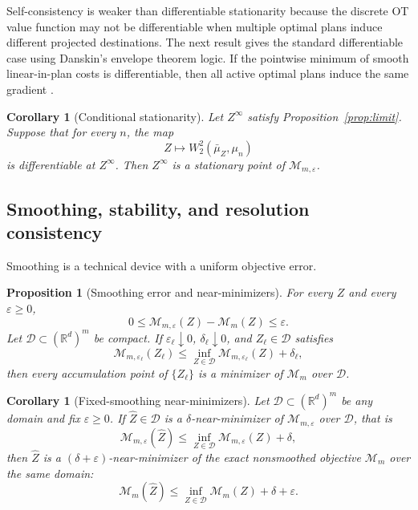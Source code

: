\documentclass[pdflatex,sn-mathphys-ay]{sn-jnl}%
\theoremstyle{thmstyleone}%
\newtheorem{proposition}[theorem]{Proposition}%
\newtheorem{corollary}[theorem]{Corollary}
\theoremstyle{thmstyletwo}%
\theoremstyle{thmstylethree}%
\newcommand{\R}{\mathbb R}
\newcommand{\calM}{\mathcal M}
\newcommand{\eps}{\varepsilon}
\newcommand{\barmu}{\bar\mu}
\begin{document}
Self-consistency is weaker than differentiable stationarity because the discrete OT value function may not be differentiable when multiple optimal plans induce different projected destinations. The next result gives the standard differentiable case using Danskin's envelope theorem logic. If the pointwise minimum of smooth linear-in-plan costs is differentiable, then all active optimal plans induce the same gradient \citep{danskin_1967_TheoryMaxMinIts}.

\begin{corollary}[Conditional stationarity]\label{cor:stationarity}
Let \(Z^\infty\) satisfy Proposition~\ref{prop:limit}. Suppose that for every \(n\), the map
\[
    Z\mapsto W_2^2(\barmu_Z,\mu_n)
\]
is differentiable at \(Z^\infty\). Then \(Z^\infty\) is a stationary point of \(\calM_{m,\eps}\).
\end{corollary}

\subsection{Smoothing, stability, and resolution consistency}

Smoothing is a technical device with a uniform objective error.

\begin{proposition}[Smoothing error and near-minimizers]\label{prop:smoothing}
For every \(Z\) and every \(\eps\ge0\),
\begin{equation}\label{eq:smoothing-bound}
    0\le \calM_{m,\eps}(Z)-\calM_m(Z)\le \eps.
\end{equation}
Let \(\mathcal D\subset(\R^d)^m\) be compact. If \(\eps_\ell\downarrow0\), \(\delta_\ell\downarrow0\), and \(Z_\ell\in\mathcal D\) satisfies
\[
    \calM_{m,\eps_\ell}(Z_\ell)
    \le
    \inf_{Z\in\mathcal D}\calM_{m,\eps_\ell}(Z)+\delta_\ell,
\]
then every accumulation point of \(\{Z_\ell\}\) is a minimizer of \(\calM_m\) over \(\mathcal D\).
\end{proposition}

\begin{corollary}[Fixed-smoothing near-minimizers]\label{cor:fixed-eps}
Let \(\mathcal D\subset(\R^d)^m\) be any domain and fix \(\eps\ge0\). If \(\hat Z\in\mathcal D\) is a \(\delta\)-near-minimizer of \(\calM_{m,\eps}\) over \(\mathcal D\), that is
\[
    \calM_{m,\eps}(\hat Z)\le \inf_{Z\in\mathcal D}\calM_{m,\eps}(Z)+\delta,
\]
then \(\hat Z\) is a \((\delta+\eps)\)-near-minimizer of the exact nonsmoothed objective \(\calM_m\) over the same domain:
\[
    \calM_m(\hat Z)\le \inf_{Z\in\mathcal D}\calM_m(Z)+\delta+\eps.
\]
\end{corollary}
\end{document}
